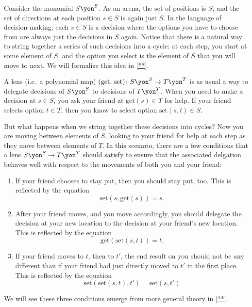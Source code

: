 \documentclass[Book-Poly]{subfiles}
\begin{document}
\begin{remark}
Consider the monomial $S\yon^S$. As an arena, the set of positions is $S$, and the set of directions at each position $s\in S$ is again just $S$.
In the language of decision-making, each $s \in S$ is a decision where the options you have to choose from are always just the decisions in $S$ again.
Notice that there is a natural way to string together a series of such decisions into a cycle: at each step, you start at some element of $S$, and the option you select is the element of $S$ that you will move to next.
We will formalize this idea in \cref{**}.

A lens (i.e.\ a polynomial map) $(\text{get, set})\colon S\yon^S\to T\yon^T$ is as usual a way to delegate decisions of $S\yon^S$ to decisions of $T\yon^T$.
When you need to make a decision at $s \in S$, you ask your friend at $\text{get}(s) \in T$ for help.
If your friend selects option $t \in T$, then you know to select option $\text{set}(s, t) \in S$.

But what happens when we string together these decisions into cycles?
Now you are moving between elements of $S$, looking to your friend for help at each step as they move between elements of $T$.
In this scenario, there are a few conditions that a lens $S\yon^S \to T\yon^T$ should satisfy to ensure that the associated delgation behaves well with respect to the movements of both you and your friend:
\begin{enumerate}
    \item If your friend chooses to stay put, then you should stay put, too.
    This is reflected by the equation
    \[
        \text{set}(s,\text{get}(s))=s.
    \]
    
    \item After your friend moves, and you move accordingly, you should delegate the decision at your new location to the decision at your friend's new location.
    This is reflected by the equation
    \[
        \text{get}(\text{set}(s,t))=t.
    \]

    \item If your friend moves to $t$, then to $t'$, the end result on you should not be any different than if your friend had just directly moved to $t'$ in the first place.
    This is reflected by the equation
    \[
        \text{set}(\text{set}(s,t),t')=\text{set}(s,t')
    \]
\end{enumerate}
We will see these three conditions emerge from more general theory in \cref{**}.
\end{remark}
\end{document}
